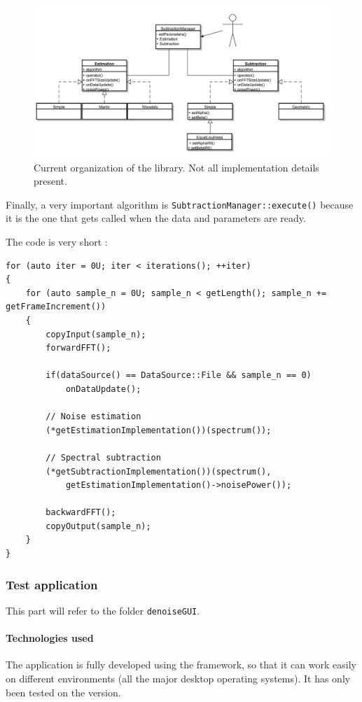\begin{figure}[h]
\begin{center}
\includegraphics[scale=0.4]{base.pdf}
\caption{Current organization of the library. Not all implementation details present.}
\label{diag_api_chords}
\end{center}
\end{figure} 
\newpage
Finally, a very important algorithm is \texttt{SubtractionManager::execute()} because it is the one that gets called when the data and parameters are ready.

The code is very short : 
\begin{lstlisting}[caption=SubtractionManager::execute() in subtraction\_manager.cpp]
for (auto iter = 0U; iter < iterations(); ++iter)
{
	for (auto sample_n = 0U; sample_n < getLength(); sample_n += getFrameIncrement())
	{
		copyInput(sample_n);
		forwardFFT();

		if(dataSource() == DataSource::File && sample_n == 0)
			onDataUpdate();

		// Noise estimation
		(*getEstimationImplementation())(spectrum());

		// Spectral subtraction
		(*getSubtractionImplementation())(spectrum(), 
			getEstimationImplementation()->noisePower());

		backwardFFT();
		copyOutput(sample_n);
	}
}
\end{lstlisting}
\subsubsection{Test application}
This part will refer to the folder \texttt{denoiseGUI}. 
\paragraph{Technologies used}
The application is fully developed using the  framework, so that it can work easily on different environments (all the major desktop operating systems). It has only been tested on the  version.


